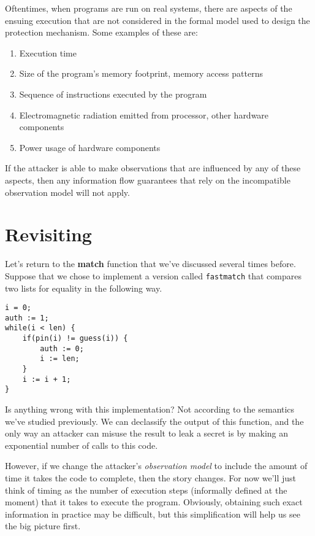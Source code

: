 \documentclass[11pt,twoside]{scrartcl}
\begin{document}
Oftentimes, when programs are run on real systems, there are aspects of the ensuing execution that are not considered in the formal model used to design the protection mechanism. Some examples of these are:
\begin{enumerate}
\item Execution time
\item Size of the program's memory footprint, memory access patterns
\item Sequence of instructions executed by the program
\item Electromagnetic radiation emitted from processor, other hardware components
\item Power usage of hardware components
\end{enumerate}
If the attacker is able to make observations that are influenced by any of these aspects, then any information flow guarantees that rely on the incompatible observation model will not apply.

\section{Revisiting }

Let's return to the \textbf{match} function that we've discussed several times before. Suppose that we chose to implement a version called \texttt{fastmatch} that compares two lists for equality in the following way.
\\[-1ex]

\begin{lstlisting}
i = 0;
auth := 1;
while(i < len) {
	if(pin(i) != guess(i)) {
		auth := 0;
		i := len;
	}
	i := i + 1;
}
\end{lstlisting}

Is anything wrong with this implementation? Not according to the semantics we've studied previously. We can declassify the output of this function, and the only way an attacker can misuse the result to leak a secret is by making an exponential number of calls to this code.

However, if we change the attacker's \emph{observation model} to include the amount of time it takes the code to complete, then the story changes. For now we'll just think of timing as the number of execution steps (informally defined at the moment) that it takes to execute the program. Obviously, obtaining such exact information in practice may be difficult, but this simplification will help us see the big picture first.
\end{document}
